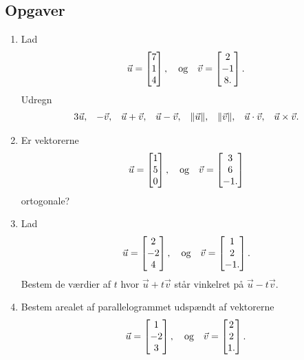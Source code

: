 \subsection{Opgaver}
\begin{enumerate}
	\item  Lad 
	\begin{align*}
	\vec{u}=\begin{bmatrix}
	7\\1\\4
	\end{bmatrix},\quad \textup{og}\quad \vec{v}=\begin{bmatrix}
	2\\-1\\8.
	\end{bmatrix}.
	\end{align*}
	Udregn
	\begin{align*}
	3\vec{u},&&-\vec{v},&&\vec{u}+\vec{v},&&\vec{u}-\vec{v},&&\Vert \vec{u}\Vert,&&\Vert \vec{v}\Vert,&&\vec{u}\cdot \vec{v},&& \vec{u}\times \vec{v}.
	\end{align*}
	
	\item Er vektorerne 
	\begin{align*}
	\vec{u}=\begin{bmatrix}
	1\\5\\0
	\end{bmatrix},\quad \textup{og}\quad \vec{v}=\begin{bmatrix}
	3\\6\\-1.
	\end{bmatrix}
	\end{align*}
	ortogonale?
	
	\item Lad
	\begin{align*}
	\vec{u}=\begin{bmatrix}
	2\\-2\\4
	\end{bmatrix},\quad \textup{og}\quad \vec{v}=\begin{bmatrix}
	1\\2\\-1.
	\end{bmatrix}.
	\end{align*}
	Bestem de værdier af $t$ hvor $\vec{u}+t\vec{v}$ står vinkelret på $\vec{u}-t\vec{v}$.

	\item Bestem arealet af parallelogrammet udspændt af vektorerne
	\begin{align*}
	\vec{u}=\begin{bmatrix}
	1\\-2\\3
	\end{bmatrix},\quad \textup{og}\quad \vec{v}=\begin{bmatrix}
	2\\2\\1.
	\end{bmatrix}.
	\end{align*}


\end{enumerate}
